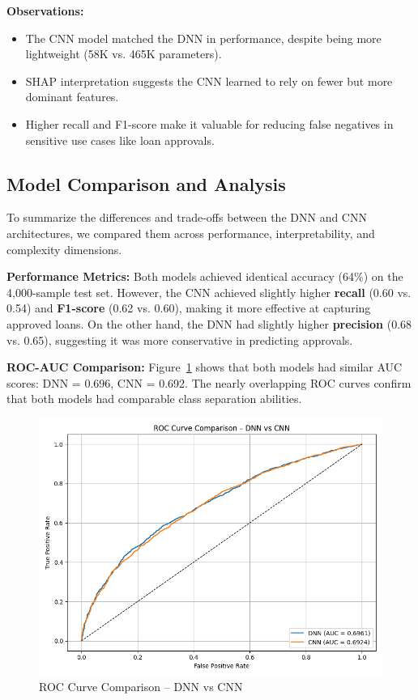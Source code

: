 \vspace{1em}
\newpage

\textbf{Observations:}
\begin{itemize}
    \item The CNN model matched the DNN in performance, despite being more lightweight (58K vs. 465K parameters).
    \item SHAP interpretation suggests the CNN learned to rely on fewer but more dominant features.
    \item Higher recall and F1-score make it valuable for reducing false negatives in sensitive use cases like loan approvals.
    
\end{itemize}
\vspace{-1em}   %

\subsection{Model Comparison and Analysis}

To summarize the differences and trade-offs between the DNN and CNN architectures, we compared them across performance, interpretability, and complexity dimensions.

\textbf{Performance Metrics:}  
Both models achieved identical accuracy (64\%) on the 4,000-sample test set. However, the CNN achieved slightly higher \textbf{recall} (0.60 vs. 0.54) and \textbf{F1-score} (0.62 vs. 0.60), making it more effective at capturing approved loans. On the other hand, the DNN had slightly higher \textbf{precision} (0.68 vs. 0.65), suggesting it was more conservative in predicting approvals.

\textbf{ROC-AUC Comparison:}  
Figure~\ref{fig:roc_comparison} shows that both models had similar AUC scores:  
DNN = 0.696, CNN = 0.692. The nearly overlapping ROC curves confirm that both models had comparable class separation abilities.

\begin{figure}[htbp]
    \centering
    \includegraphics[width=0.75\linewidth]{figures/roc_comparison_dnn_vs_cnn.png}
    \caption{ROC Curve Comparison – DNN vs CNN}
    \label{fig:roc_comparison}
\end{figure}

